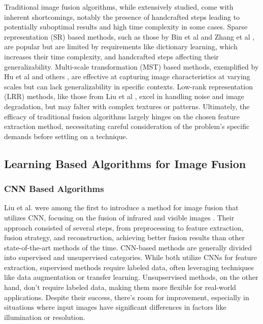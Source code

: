 Traditional image fusion algorithms, while extensively studied, come with inherent shortcomings, notably the presence of handcrafted steps leading to potentially suboptimal results and high time complexity in some cases. Sparse representation (SR) based methods, such as those by Bin et al \cite{bin2016efficient} and Zhang et al \cite{zhang2013dictionary}, are popular but are limited by requirements like dictionary learning, which increases their time complexity, and handcrafted steps affecting their generalizability. Multi-scale transformation (MST) based methods, exemplified by Hu et al \cite{hu2017adaptive} and others \cite{he2017infrared}, are effective at capturing image characteristics at varying scales but can lack generalizability in specific contexts. Low-rank representation (LRR) methods, like those from Liu et al \cite{liu2012robust}, excel in handling noise and image degradation, but may falter with complex textures or patterns. Ultimately, the efficacy of traditional fusion algorithms largely hinges on the chosen feature extraction method, necessitating careful consideration of the problem's specific demands before settling on a technique.

\subsection{Learning Based Algorithms for Image Fusion}

\subsubsection{CNN Based Algorithms}
Liu et al. were among the first to introduce a method for image fusion that utilizes CNN, focusing on the fusion of infrared and visible images \cite{liu2018infrared}. Their approach consisted of several steps, from preprocessing to feature extraction, fusion strategy, and reconstruction, achieving better fusion results than other state-of-the-art methods of the time. CNN-based methods are generally divided into supervised and unsupervised categories. While both utilize CNNs for feature extraction, supervised methods require labeled data, often leveraging techniques like data augmentation or transfer learning. Unsupservised methods, on the other hand, don't require labeled data, making them more flexible for real-world applications. Despite their success, there's room for improvement, especially in situations where input images have significant differences in factors like illumination or resolution.

